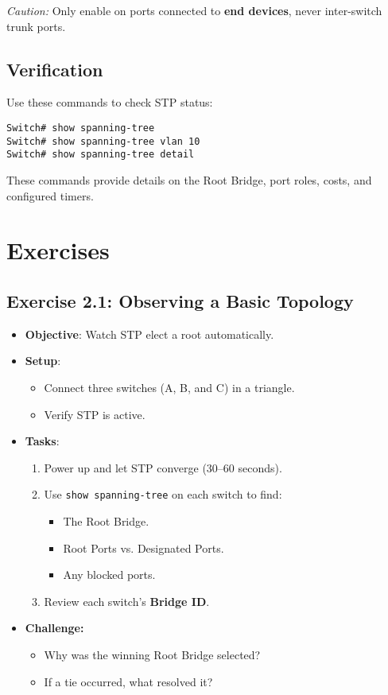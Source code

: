 \documentclass[a4paper]{report}
\begin{document}
\textit{Caution:} Only enable on ports connected to \textbf{end devices}, never inter-switch trunk ports.

\subsection{Verification}
Use these commands to check STP status:
\begin{lstlisting}
Switch# show spanning-tree
Switch# show spanning-tree vlan 10
Switch# show spanning-tree detail
\end{lstlisting}

These commands provide details on the Root Bridge, port roles, costs, and configured timers.

\section{Exercises}
\subsection*{Exercise 2.1: Observing a Basic Topology}
\begin{itemize}
  \item \textbf{Objective}: Watch STP elect a root automatically.
  \item \textbf{Setup}:
  
  \begin{itemize}
    \item Connect three switches (A, B, and C) in a triangle. 
    \item Verify STP is active.
    

  \end{itemize}
  \item \textbf{Tasks}:
  \begin{enumerate}
    \item Power up and let STP converge (30–60 seconds).
    \item Use \texttt{show spanning-tree} on each switch to find:
      \begin{itemize}
        \item The Root Bridge.
        \item Root Ports vs. Designated Ports.
        \item Any blocked ports.
      \end{itemize}
    \item Review each switch’s \textbf{Bridge ID}.
  \end{enumerate}

\item \textbf{Challenge:}
\begin{itemize}
  \item Why was the winning Root Bridge selected?
  \item If a tie occurred, what resolved it?
\end{itemize}
\end{itemize}
\end{document}
